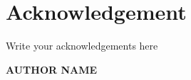 \chapter*{Acknowledgement}
 Write your acknowledgements here
\vspace*{30pt}
\begin{flushright}
\textbf{AUTHOR NAME}
\end{flushright}